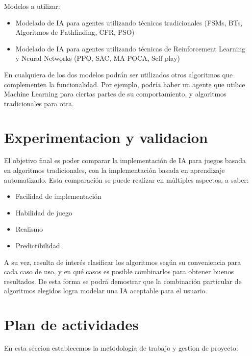 \documentclass{article}
\begin{document}
Modelos a utilizar:
\begin{itemize}
    \item Modelado de IA para agentes utilizando técnicas tradicionales (FSMs, BTs, Algoritmos de Pathfinding, CFR, PSO)
    \item Modelado de IA para agentes utilizando técnicas de Reinforcement Learning y Neural Networks (PPO, SAC, MA-POCA, Self-play)
\end{itemize}

En cualquiera de los dos modelos podrán ser utilizados otros algoritmos que complementen la funcionalidad. Por ejemplo, podría haber un agente que utilice Machine Learning para ciertas partes de su comportamiento, y algoritmos tradicionales para otra.

\section{Experimentacion y validacion}
El objetivo final es poder comparar la implementación de IA para juegos basada en algoritmos tradicionales, con la implementación basada en aprendizaje automatizado. Esta comparación se puede realizar en múltiples aspectos, a saber:
\begin{itemize}
    \item Facilidad de implementación
    \item Habilidad de juego
    \item Realismo
    \item Predictibilidad
\end{itemize}
A su vez, resulta de interés clasificar los algoritmos según su conveniencia para cada caso de uso, y en qué casos es posible combinarlos para obtener buenos resultados. De esta forma se podrá demostrar que la combinación particular de algoritmos elegidos logra modelar una IA aceptable para el usuario.

\section{Plan de actividades}

En esta seccion establecemos la metodología de trabajo y gestion de proyecto:
\end{document}
